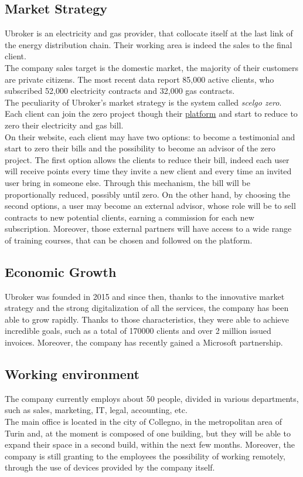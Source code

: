 \documentclass[12pt, a4paper, oneside]{article}
\begin{document}
\subsection{Market Strategy}
Ubroker is an electricity and gas provider, that collocate itself at the last link of the energy distribution chain. Their working area is indeed the sales to the final client.\\
The company sales target is the domestic market, the majority of their customers are private citizens. The most recent data report 85,000 active clients, who subscribed 52,000 electricity contracts
and 32,000 gas contracts.\\
The peculiarity of Ubroker's market strategy is the system called \emph{scelgo zero}. Each client can join the zero project though their \href{https://scelgozero.it/}{platform} and start to reduce to zero their
electricity and gas bill.\\
On their website, each client may have two options: to become a testimonial and start to zero their bills and the possibility to become an advisor of the zero project. The first option allows the clients to reduce their bill, indeed each user will receive points
every time they invite a new client and every time an invited user bring in someone else. Through this mechanism, the bill will be proportionally reduced, possibly until zero.
On the other hand, by choosing the second options, a user may become an external advisor, whose role will be to sell contracts to new potential clients, earning a commission for each new subscription. 
Moreover, those external partners will have access to a wide range of training courses, that can be chosen and followed on the platform.

\newpage
\subsection{Economic Growth}
Ubroker was founded in 2015 and since then, thanks to the innovative market strategy and the strong digitalization of all the services, the company has been able to grow rapidly. Thanks to those characteristics,
they were able to achieve incredible goals, such as a total of 170000 clients and over 2 million issued invoices. Moreover, the company has recently gained a Microsoft partnership.

\subsection{Working environment}
The company currently employs about 50 people, divided in various departments, such as sales, marketing, IT, legal, accounting, etc.\\
The main office is located in the city of Collegno, in the metropolitan area of Turin and, at the moment is composed of one building, but they will be able to expand their space in a second build, within the next
few months. Moreover, the company is still granting to the employees the possibility of working remotely, through the use of devices provided by the company itself.
\end{document}
